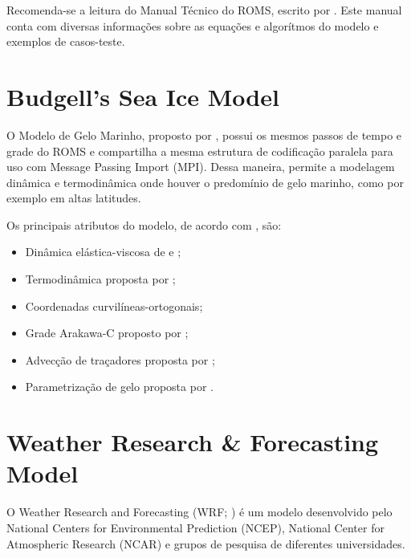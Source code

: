 \noindent Recomenda-se a leitura do Manual Técnico do ROMS, escrito por \textcite{hedstrom2018}. Este manual conta com diversas 
          informações sobre as equações e algorítmos do modelo e exemplos de casos-teste. 



\section{Budgell's Sea Ice Model}\label{seaicesecao}
\bigskip

\noindent O Modelo de Gelo Marinho, proposto por \textcite{Budgell2005}, possui os mesmos passos de tempo e grade do ROMS e 
          compartilha a mesma estrutura de codificação paralela para uso com Message Passing Import (MPI). Dessa maneira, 
          permite a modelagem dinâmica e termodinâmica onde houver o predomínio de gelo marinho, como por exemplo em altas latitudes. 
\bigskip

\noindent Os principais atributos do modelo, de acordo com \textcite{hedstrom2018}, são:
\bigskip
\begin{itemize}
    \item Dinâmica elástica-viscosa de \textcite{Hunke1997} e \textcite{Hunke2001};
    \item Termodinâmica proposta por \textcite{Mellor1989};
    \item Coordenadas curvilíneas-ortogonais;
    \item Grade Arakawa-C proposto  por \textcite{Arakawa1977};
    \item Advecção de traçadores proposta por \textcite{Smolarkiewicz1990};
    \item Parametrização de gelo proposta por \textcite{Lemieux2015}.
\end{itemize}
\bigskip



\section{Weather Research \& Forecasting Model}\label{secaowrf}
\bigskip

\noindent O Weather Research and Forecasting (WRF; \cite{Skamarock2008}) é um modelo desenvolvido pelo National Centers for 
          Environmental Prediction (NCEP), National Center for Atmospheric Research (NCAR) e grupos de pesquisa de diferentes
          universidades.
\bigskip

